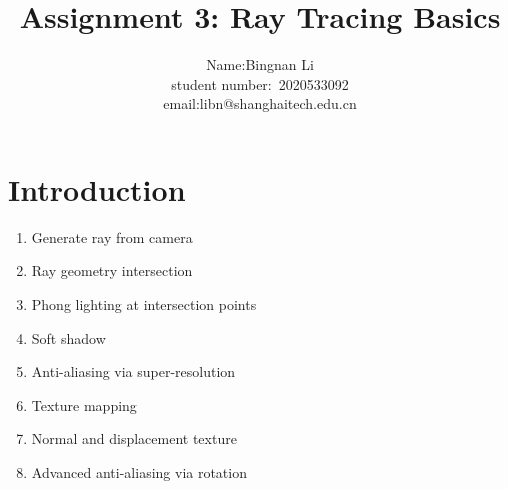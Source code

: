 \documentclass[acmtog]{acmart}
\title{Assignment 3: {Ray Tracing Basics}}
\author{Name:\quad Bingnan Li  \\ student number:\ 2020533092
\\email:\quad libn@shanghaitech.edu.cn}
\begin{document}
\maketitle

\vspace*{2 ex}

\section{Introduction}
\begin{enumerate}
	\item Generate ray from camera
	\item Ray geometry intersection
	\item Phong lighting at intersection points
	\item Soft shadow
	\item Anti-aliasing via super-resolution
	\item Texture mapping
	\item Normal and displacement texture
	\item Advanced anti-aliasing via rotation
\end{enumerate}
\end{document}
